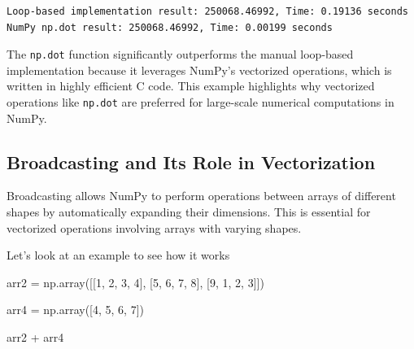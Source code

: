 \documentclass[
  letterpaper,
  DIV=11,
  numbers=noendperiod]{scrreprt}
\newenvironment{Shaded}{\begin{snugshade}}{\end{snugshade}}
\newcommand{\DecValTok}[1]{\textcolor[rgb]{0.68,0.00,0.00}{#1}}
\newcommand{\NormalTok}[1]{\textcolor[rgb]{0.00,0.23,0.31}{#1}}
\newcommand{\OperatorTok}[1]{\textcolor[rgb]{0.37,0.37,0.37}{#1}}
\begin{document}
\begin{verbatim}
Loop-based implementation result: 250068.46992, Time: 0.19136 seconds
NumPy np.dot result: 250068.46992, Time: 0.00199 seconds
\end{verbatim}

The \texttt{np.dot} function significantly outperforms the manual
loop-based implementation because it leverages NumPy's vectorized
operations, which is written in highly efficient C code. This example
highlights why vectorized operations like \texttt{np.dot} are preferred
for large-scale numerical computations in NumPy.

\hypertarget{broadcasting-and-its-role-in-vectorization}{%
\subsection{Broadcasting and Its Role in
Vectorization}\label{broadcasting-and-its-role-in-vectorization}}

Broadcasting allows NumPy to perform operations between arrays of
different shapes by automatically expanding their dimensions. This is
essential for vectorized operations involving arrays with varying
shapes.

Let's look at an example to see how it works

\begin{Shaded}
\begin{Highlighting}[]
\NormalTok{arr2 }\OperatorTok{=}\NormalTok{ np.array([[}\DecValTok{1}\NormalTok{, }\DecValTok{2}\NormalTok{, }\DecValTok{3}\NormalTok{, }\DecValTok{4}\NormalTok{], }
\NormalTok{                 [}\DecValTok{5}\NormalTok{, }\DecValTok{6}\NormalTok{, }\DecValTok{7}\NormalTok{, }\DecValTok{8}\NormalTok{], }
\NormalTok{                 [}\DecValTok{9}\NormalTok{, }\DecValTok{1}\NormalTok{, }\DecValTok{2}\NormalTok{, }\DecValTok{3}\NormalTok{]])}
\end{Highlighting}
\end{Shaded}

\begin{Shaded}
\begin{Highlighting}[]
\NormalTok{arr4 }\OperatorTok{=}\NormalTok{ np.array([}\DecValTok{4}\NormalTok{, }\DecValTok{5}\NormalTok{, }\DecValTok{6}\NormalTok{, }\DecValTok{7}\NormalTok{])}
\end{Highlighting}
\end{Shaded}

\begin{Shaded}
\begin{Highlighting}[]
\NormalTok{arr2 }\OperatorTok{+}\NormalTok{ arr4}
\end{Highlighting}
\end{Shaded}
\end{document}
